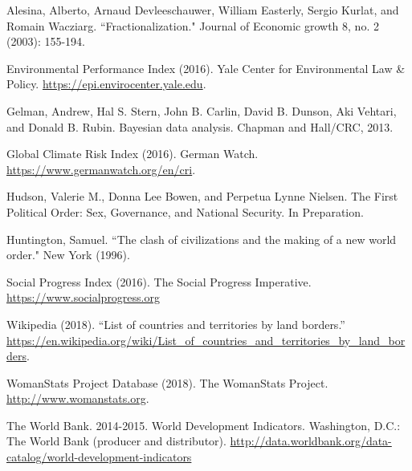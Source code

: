 \documentclass[letterpaper,10.5pt]{article}
\begin{document}
\begin{thebibliography}{1}

 Alesina, Alberto, Arnaud Devleeschauwer, William Easterly, Sergio Kurlat, and Romain Wacziarg. ``Fractionalization." Journal of Economic growth 8, no. 2 (2003): 155-194.

 Environmental Performance Index (2016). Yale Center for Environmental Law \& Policy. \url{https://epi.envirocenter.yale.edu}.

 Gelman, Andrew, Hal S. Stern, John B. Carlin, David B. Dunson, Aki Vehtari, and Donald B. Rubin. Bayesian data analysis. Chapman and Hall/CRC, 2013.

 Global Climate Risk Index (2016). German Watch. \url{https://www.germanwatch.org/en/cri}.

 Hudson, Valerie M., Donna Lee Bowen, and Perpetua Lynne Nielsen. The First Political Order: Sex, Governance, and National Security. In Preparation.

 Huntington, Samuel. ``The clash of civilizations and the making of a new world order." New York (1996).

 Social Progress Index (2016). The Social Progress Imperative. \url{https://www.socialprogress.org}

 Wikipedia (2018). “List of countries and territories by land borders.” \url{https://en.wikipedia.org/wiki/List\_of\_countries\_and\_territories\_by\_land\_borders}.

 WomanStats Project Database (2018). The WomanStats Project. \url{http://www.womanstats.org}.

 The World Bank. 2014-2015. World Development Indicators. Washington, D.C.: The World Bank (producer and distributor). \url{http://data.worldbank.org/data-catalog/world-development-indicators}

\end{thebibliography}
\end{document}
